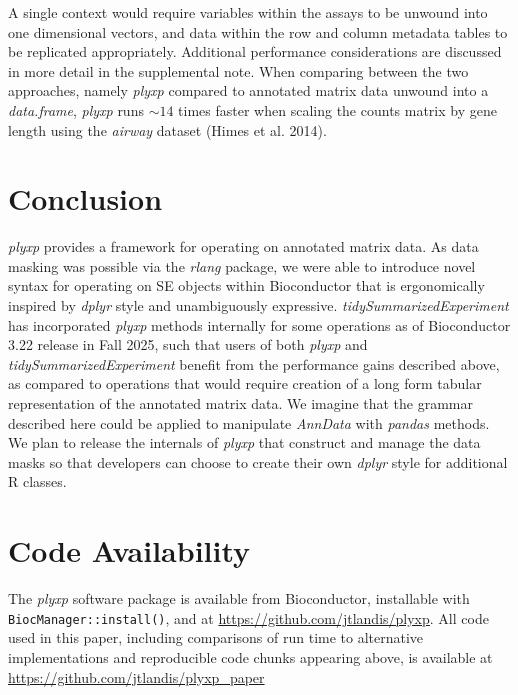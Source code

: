 \documentclass[
  letterpaper,
  DIV=11,
  numbers=noendperiod]{scrartcl}
\begin{document}
A single context would require variables within the assays to be unwound
into one dimensional vectors, and data within the row and column
metadata tables to be replicated appropriately. Additional performance
considerations are discussed in more detail in the supplemental note.
When comparing between the two approaches, namely \emph{plyxp} compared
to annotated matrix data unwound into a \emph{data.frame}, \emph{plyxp}
runs \(\sim 14\) times faster when scaling the counts matrix by gene
length using the \emph{airway} dataset (Himes et al. 2014).

\section{Conclusion}\label{conclusion}

\emph{plyxp} provides a framework for operating on annotated matrix
data. As data masking was possible via the \emph{rlang} package, we were
able to introduce novel syntax for operating on SE objects within
Bioconductor that is ergonomically inspired by \emph{dplyr} style and
unambiguously expressive. \emph{tidySummarizedExperiment} has
incorporated \emph{plyxp} methods internally for some operations as of
Bioconductor 3.22 release in Fall 2025, such that users of both
\emph{plyxp} and \emph{tidySummarizedExperiment} benefit from the
performance gains described above, as compared to operations that would
require creation of a long form tabular representation of the annotated
matrix data. We imagine that the grammar described here could be applied
to manipulate \emph{AnnData} with \emph{pandas} methods. We plan to
release the internals of \emph{plyxp} that construct and manage the data
masks so that developers can choose to create their own \emph{dplyr}
style for additional R classes.

\section{Code Availability}\label{code-availability}

The \emph{plyxp} software package is available from Bioconductor,
installable with \texttt{BiocManager::install()}, and at
\url{https://github.com/jtlandis/plyxp}. All code used in this paper,
including comparisons of run time to alternative implementations and
reproducible code chunks appearing above, is available at
\url{https://github.com/jtlandis/plyxp_paper}

\newpage
\end{document}
